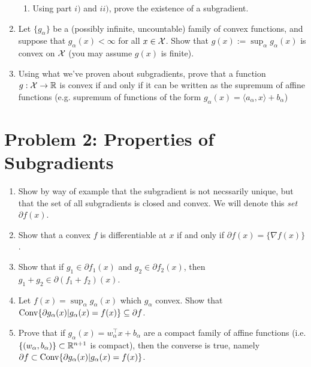\documentclass[12pt]{article}
\begin{document}
\begin{enumerate}
\begin{enumerate}
\item
Using part $i)$ and $ii)$, prove the existence of a subgradient. 
\end{enumerate}

\item
Let $\{g_{\alpha}\}$ be a (possibly infinite, uncountable) family of convex functions, and suppose that $g_{\alpha}(x) < \infty$ for all $x \in {\cal X}$. Show that $g(x) := \sup_{\alpha} g_{\alpha}(x)$ is convex on ${\cal X}$ (you may assume $g(x)$ is finite).

\item
Using what we've proven about subgradients, prove that a function $g: {\cal X} \to \mathbb{R}$ is convex if and only if it can be written as the supremum of affine functions (e.g. supremum of functions of the form $g_{\alpha}(x) = \langle a_{\alpha}, x \rangle + b_{\alpha}$)
\end{enumerate}

\section*{Problem 2: Properties of Subgradients}

\begin{enumerate}
\item
Show by way of example that the subgradient is not necssarily unique, but that the set of all subgradients is closed and convex. We will denote this \emph{set} $\partial f(x)$.
\item
Show that a convex $f$ is differentiable at $x$ if and only if $\partial f(x) = \{\nabla f(x)\}$. 
\item
Show that if $g_1 \in \partial f_1(x)$ and $g_2 \in \partial f_2(x)$, then $g_1 + g_2 \in \partial(f_1 + f_2)(x)$. 
\item
Let $f(x) = \sup_{\alpha} g_{\alpha}(x)$ which $g_{\alpha}$ convex. Show that $\mathrm{Conv} \{\partial g_{\alpha}(x) |  g_{\alpha}(x) =f(x) \} \subseteq \partial f$. 
\item
Prove that if $g_{\alpha}(x) = w_{\alpha}^\top x +
b_{\alpha}$ are a compact family of affine functions (i.e.
$\{(w_{\alpha},b_{\alpha})\} \subset \mathbb{R}^{n+1}$ is compact), then the converse is true, namely $\partial f \subset \mathrm{Conv} \{\partial g_{\alpha}(x) |  g_{\alpha}(x) =f(x) \} $. 
\end{enumerate}
\end{document}
